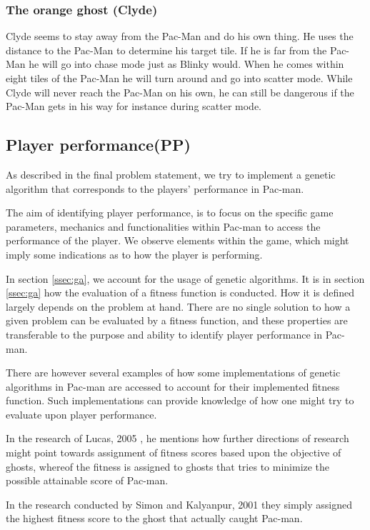 \subsubsection*{The orange ghost (Clyde)}
Clyde seems to stay away from the Pac-Man and do his own thing. He uses the distance to the Pac-Man to determine his target tile. If he is far from the Pac-Man he will go into chase mode just as Blinky would. When he comes within eight tiles of the Pac-Man he will turn around and go into scatter mode. While Clyde will never reach the Pac-Man on his own, he can still be dangerous if the Pac-Man gets in his way for instance during scatter mode.


\subsection{Player performance(PP)}\label{ssec:player-performance}

As described in the final problem statement, we try to implement a genetic algorithm that corresponds to the players' performance in Pac-man.


The aim of identifying player performance, is to focus on the specific game parameters, mechanics and functionalities within Pac-man to access the performance of the player. We observe elements within the game, which might imply some indications as to how the player is performing.

In section \ref{ssec:ga}, we account for the usage of genetic algorithms. It is in section \ref{ssec:ga} how the evaluation of a fitness function is conducted. How it is defined largely depends on the problem at hand. There are no single solution to how a given problem can be evaluated by a fitness function, and these properties are transferable to the purpose and ability to identify player performance in Pac-man.

There are however several examples of how some implementations of genetic algorithms in Pac-man are accessed to account for their implemented fitness function. Such implementations can provide knowledge of how one might try to evaluate upon player performance.

In the research of Lucas, 2005 \cite{Lucas2005}, he mentions how further directions of research might point towards assignment of fitness scores based upon the objective of ghosts, whereof the fitness is assigned to ghosts that tries to minimize the possible attainable score of Pac-man.

In the research conducted by Simon and Kalyanpur, 2001 \cite{Kalyanpur2001} they simply assigned the highest fitness score to the ghost that actually caught Pac-man.

